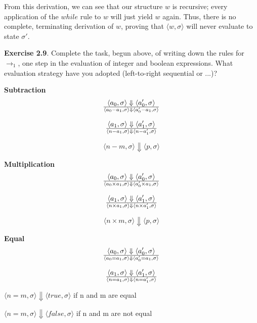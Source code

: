\documentclass{article}
\begin{document}
From this derivation, we can see that our structure $w$ is recursive; every application of the $while$ rule to $w$ will just yield $w$ again. Thus, there is no complete, terminating derivation of $w$, proving that $\langle w, \sigma \rangle$ will never evaluate to state $\sigma'$.

\bigskip
\noindent\textbf{Exercise 2.9}. Complete the task, begun above, of writing down the rules for $\rightarrow_1$, one step in the evaluation of integer and boolean expressions. What evaluation strategy have you adopted (left-to-right sequential or ...)?

\bigskip

\begin{minipage}[t]{0.45\textwidth}
  \textbf{Subtraction}
  $$
  \langle a_0, \sigma \rangle \Downarrow \langle a_0', \sigma \rangle \over
  \langle a_0 - a_1, \sigma \rangle \Downarrow \langle a_0' - a_1, \sigma \rangle
  $$
  
  $$
  \langle a_1, \sigma \rangle \Downarrow \langle a_1', \sigma \rangle \over
  \langle n - a_1, \sigma \rangle \Downarrow \langle n - a_1', \sigma \rangle
  $$
  
  $$
  \langle n - m, \sigma \rangle \Downarrow \langle p, \sigma \rangle
  $$
\end{minipage}
\begin{minipage}[t]{0.45\textwidth}
  \textbf{Multiplication}
  $$
  \langle a_0, \sigma \rangle \Downarrow \langle a_0', \sigma \rangle \over
  \langle a_0 \times a_1, \sigma \rangle \Downarrow \langle a_0' \times a_1, \sigma \rangle
  $$
  
  $$
  \langle a_1, \sigma \rangle \Downarrow \langle a_1', \sigma \rangle \over
  \langle n \times a_1, \sigma \rangle \Downarrow \langle n \times a_1', \sigma \rangle
  $$
  
  $$
  \langle n \times m, \sigma \rangle \Downarrow \langle p, \sigma \rangle
  $$
\end{minipage}

\bigskip

\begin{minipage}[t]{0.9\textwidth}
  \textbf{Equal}
  $$
  \langle a_0, \sigma \rangle \Downarrow \langle a_0', \sigma \rangle \over
  \langle a_0 = a_1, \sigma \rangle \Downarrow \langle a_0' = a_1, \sigma \rangle
  $$
  
  $$
  \langle a_1, \sigma \rangle \Downarrow \langle a_1', \sigma \rangle \over
  \langle n = a_1, \sigma \rangle \Downarrow \langle n = a_1', \sigma \rangle
  $$
  
  \centering
  $
  \langle n = m, \sigma \rangle \Downarrow \langle true, \sigma \rangle 
  $ \hspace{5mm} if n and m are equal

  \centering
  $
  \langle n = m, \sigma \rangle \Downarrow \langle false, \sigma \rangle 
  $ \hspace{5mm} if n and m are not equal
\end{minipage}
\end{document}
